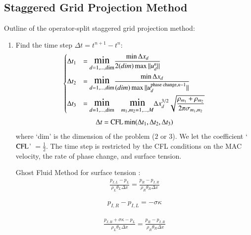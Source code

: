 \documentclass[preprint,12pt]{Definitions/elsarticle}
\newcommand{\tn}{\textnormal}
\begin{document}
\subsection{Staggered Grid Projection Method}
Outline of the operator-split staggered grid projection method:
\begin{enumerate}
	\item Find the time step $\Delta t=t^{n+1}-t^{n}$:
	\begin{equation}
	\begin{dcases}
	\Delta t_{1}&=\mathlarger{\mathlarger{\min}}_{d=1,\ldots,\tn{dim}}
	\frac{\min \Delta x_{d}}{2 (dim) \max||u_{d}^{n}||} \\	
	\Delta t_{2}&=\mathlarger{\mathlarger{\min}}_{d=1,\ldots,\tn{dim}}
	\frac{\min\Delta x_{d}}{(dim)\max||u_{d}^{\tn{phase change},n-1}||} \\
	\Delta t_{3}&=\mathlarger{\mathlarger{\min}}_{d=1,\ldots,\tn{dim}} \quad
	\mathlarger{\mathlarger{\min}}_{m_1,m_2=1,\ldots,M}
	\Delta x_{d}^{3/2}
	\sqrt{\frac{\rho_{m_1}+\rho_{m_2}}
		{2\pi\sigma_{m_1,m_2}}} 
	\end{dcases}
	\label{stiffconstraint}
	\end{equation}
	\begin{equation}
	\Delta t = \tn{CFL} \min(\Delta t_{1},\Delta t_{2},\Delta t_{3})
	\end{equation}
	where `dim' is the dimension of the problem ($2$ or $3$). We let the coefficient `$\tn{CFL}$' $= \frac{1}{2}$. The time step is restricted by the CFL conditions on the MAC velocity, the rate of phase change, and surface tension.\\




\par\noindent
Ghost Fluid Method for surface tension \cite{kang2000boundary}:
\begin{eqnarray*}
\frac{p_{I,L}-p_{L}}{\rho_{L}\theta_{L}\Delta x}=
\frac{p_{R}-p_{I,R}}{\rho_{R}\theta_{R}\Delta x}
\end{eqnarray*}

\begin{eqnarray*}
p_{I,R}-p_{I,L}=-\sigma\kappa 
\end{eqnarray*}

\begin{eqnarray*}
\frac{p_{I,R}+\sigma\kappa-p_{L}}{\rho_{L}\theta_{L}\Delta x}=
\frac{p_{R}-p_{I,R}}{\rho_{R}\theta_{R}\Delta x}
\end{eqnarray*}


\end{enumerate}
\end{document}
